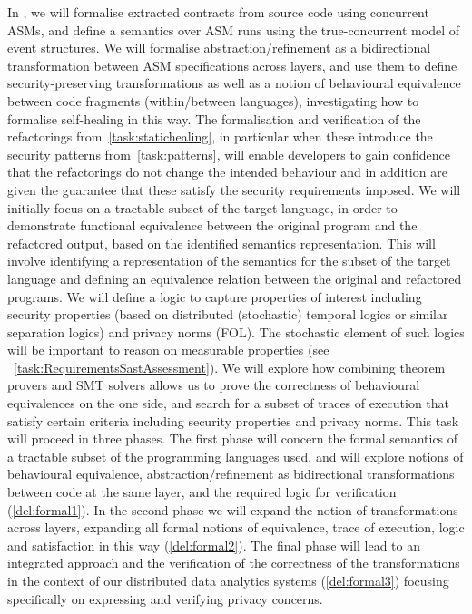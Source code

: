 \begin{Workpackage}{\thewpno}
\begin{Task}
\TaskResults{%
\ref{del:formal1},
\ref{del:formal2},
\ref{del:formal3}
}
\TaskHeader{}

In \theTask, we will formalise extracted contracts from source code using concurrent ASMs, and define a semantics over ASM runs using the true-concurrent model of event structures. 
We will formalise abstraction/refinement as a bidirectional transformation between ASM specifications across layers, and use them to define 
security-preserving transformations as well as a notion of behavioural equivalence between code fragments (within/between languages), investigating how to formalise self-healing in this way.
The formalisation and verification of the refactorings from~\ref{task:statichealing}, in particular when these introduce the security patterns from~\ref{task:patterns}, will enable developers to gain confidence that the
refactorings do not change the intended behaviour and in addition are given the guarantee that these satisfy the security requirements imposed. We will initially focus on a tractable subset of the target language, in order to demonstrate functional  equivalence between the original program and the refactored output, based on the identified semantics representation. This will involve identifying a representation of the semantics for the subset of the target language and defining an equivalence relation between the original and refactored programs. 
We will define a logic to capture properties of interest  including security properties (based on distributed (stochastic) temporal logics or similar separation
logics) and privacy norms (FOL). The stochastic element of such logics will be important to reason on measurable properties (see ~\ref{task:RequirementsSastAssessment}).
We will explore how combining theorem provers and SMT solvers allows us to prove the correctness of behavioural equivalences on the one side, and search for a subset of traces of execution that satisfy certain criteria including security properties and privacy norms.
This task will proceed in three phases. The first phase will concern the formal semantics of a tractable subset 
of the programming languages used, and will explore notions of behavioural equivalence, abstraction/refinement as bidirectional transformations between code at the same layer, and the required logic for verification (\ref{del:formal1}). In the second phase we will expand the notion of transformations across layers, expanding all formal notions of equivalence, trace of execution, logic and satisfaction in this way  (\ref{del:formal2}). The final phase will lead to an integrated approach and the verification of the correctness of the transformations in the context of our distributed data analytics systems (\ref{del:formal3}) focusing specifically on expressing and verifying privacy concerns.

\end{Task}
\end{Workpackage}
